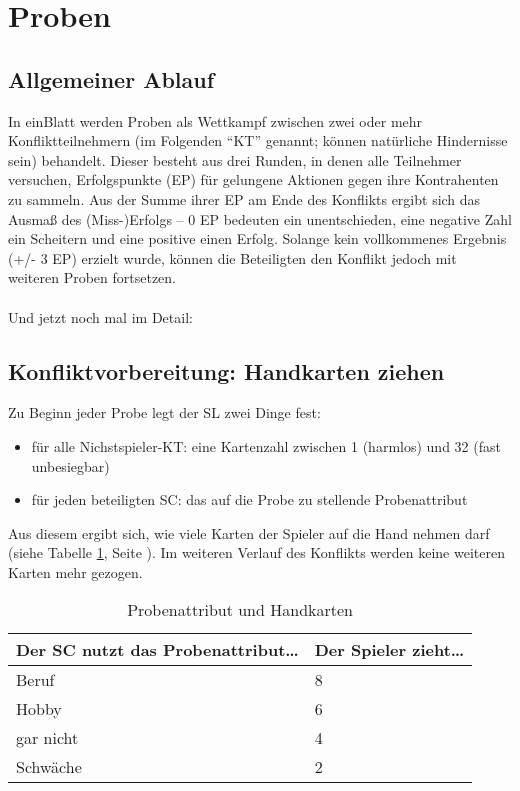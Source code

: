\section {Proben}
\subsection {Allgemeiner Ablauf}
In einBlatt werden Proben als Wettkampf zwischen zwei oder mehr Konfliktteilnehmern (im Folgenden "`KT"' genannt; können natürliche Hindernisse sein) behandelt. Dieser besteht aus drei Runden, in denen alle Teilnehmer versuchen, Erfolgspunkte (EP) für gelungene Aktionen gegen ihre Kontrahenten zu sammeln. Aus der Summe ihrer EP am Ende des Konflikts ergibt sich das Ausmaß des (Miss-)Erfolgs -- 0 EP bedeuten ein unentschieden, eine negative Zahl ein Scheitern und eine positive einen Erfolg. Solange kein vollkommenes Ergebnis (+/- 3 EP) erzielt wurde, können die Beteiligten den Konflikt jedoch mit weiteren Proben fortsetzen.
\\
\\
Und jetzt noch mal im Detail:
\subsection {Konfliktvorbereitung: Handkarten ziehen}
Zu Beginn jeder Probe legt der SL zwei Dinge fest:
\begin{itemize}
\item für alle Nichstspieler-KT: eine Kartenzahl zwischen 1 (harmlos) und 32 (fast unbesiegbar)
\item für jeden beteiligten SC: das auf die Probe zu stellende Probenattribut
\end{itemize}
Aus diesem ergibt sich, wie viele Karten der Spieler auf die Hand nehmen darf (siehe Tabelle \ref {tab:probenattributundhandkarten}, Seite \pageref {tab:probenattributundhandkarten}). Im weiteren Verlauf des Konflikts werden keine weiteren Karten mehr gezogen.

\begin{table}[H]
\caption{Probenattribut und Handkarten}
\label{tab:probenattributundhandkarten}
\begin{tabular}{|l|l|}
\hline
Der SC nutzt das Probenattribut\dots & Der Spieler zieht\dots \\
\hline
Beruf & 8 \\
Hobby & 6 \\
gar nicht & 4 \\
Schwäche & 2 \\
\hline
\end{tabular}
\end{table}

